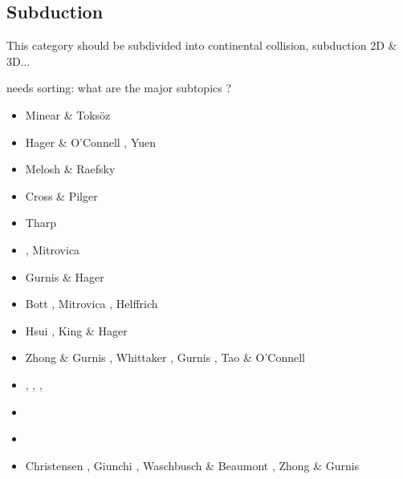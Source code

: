 \subsection{Subduction} 
This category should be subdivided into continental collision, subduction 2D \& 3D...

{\color{red} needs sorting: what are the major subtopics ? } 

\begin{scriptsize}
\begin{itemize}
\item[\nineteenseventy] Minear \& Toks{\"o}z \cite{mito70}
\item[\nineteenseventyeight] Hager \& O'Connell \cite{haoc78}, Yuen \etal \cite{yufs78}
\item[\nineteeneighty] Melosh \& Raefsky \cite{mera80}
\item[\nineteeneightytwo] Cross \& Pilger \cite{crpi82}
\item[\nineteeneightyfive] Tharp \cite{thar85}
\item[\nineteeneightysix] \cite{jarr86}, Mitrovica \etal \cite{mipb96}
\item[\nineteeneightyeight] Gurnis \& Hager \cite{guha88}
\item[\nineteeneightynine] Bott \etal \cite{boww89}, Mitrovica \etal \cite{mibj89},
                           Helffrich \etal \cite{hesw89}
\item[\nineteenninety] Hsui \etal \cite{hstt90}, King \& Hager \cite{kiha90}
\item[\nineteenninetytwo] Zhong \& Gurnis \cite{zhgu92}, Whittaker \etal \cite{whbw92}, 
                          Gurnis \cite{gurn92}, Tao \& O'Connell \cite{taoc92}
\item[\nineteenninetythree] \cite{jope93}, \cite{dvnm93}, \cite{wibf93}, \cite{shem93}
\item[\nineteenninetyfour] \cite{zhgu94}\cite{wibe94}
                           \cite{wdbo94a}\cite{wdbo94b}
                           \cite{bequ94}\cite{gaha94}
\item[\nineteenninetyfive] \cite{masa95}
\item[\nineteenninetysix] Christensen \cite{chri96}, Giunchi \etal \cite{gisb96},
                          Waschbusch \& Beaumont \cite{wabe96}, Zhong \& Gurnis \cite{zhgu96}

\end{itemize}
\end{scriptsize}
